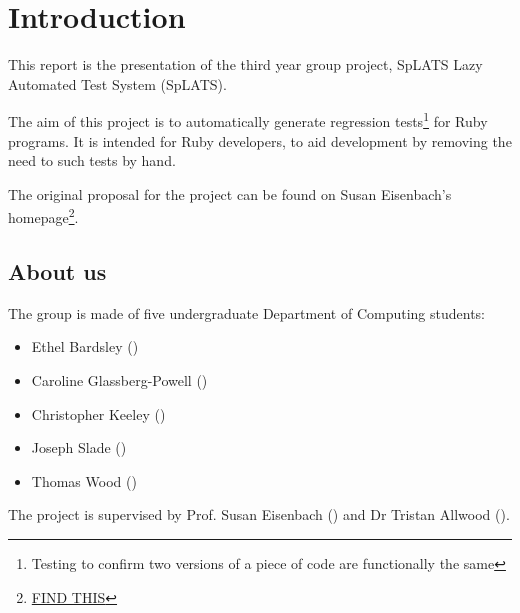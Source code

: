 \chapter{Introduction}

This report is the presentation of the third year group project, SpLATS Lazy Automated Test System (SpLATS).

The aim of this project is to automatically generate regression tests\footnote{Testing to confirm two versions of a piece of code are functionally the same} for Ruby programs.
It is intended for Ruby developers, to aid development by removing the need to such tests by hand.

The original proposal for the project can be found on Susan Eisenbach's homepage\footnote{\url{FIND THIS}}.

\section{About us}
  The group is made of five undergraduate Department of Computing students:
  \begin{itemize}
    \item{Ethel Bardsley ()}
    \item{Caroline Glassberg-Powell ()}
    \item{Christopher Keeley ()}
    \item{Joseph Slade ()}
    \item{Thomas Wood ()}
  \end{itemize}

  The project is supervised by Prof. Susan Eisenbach () and Dr Tristan Allwood ().
